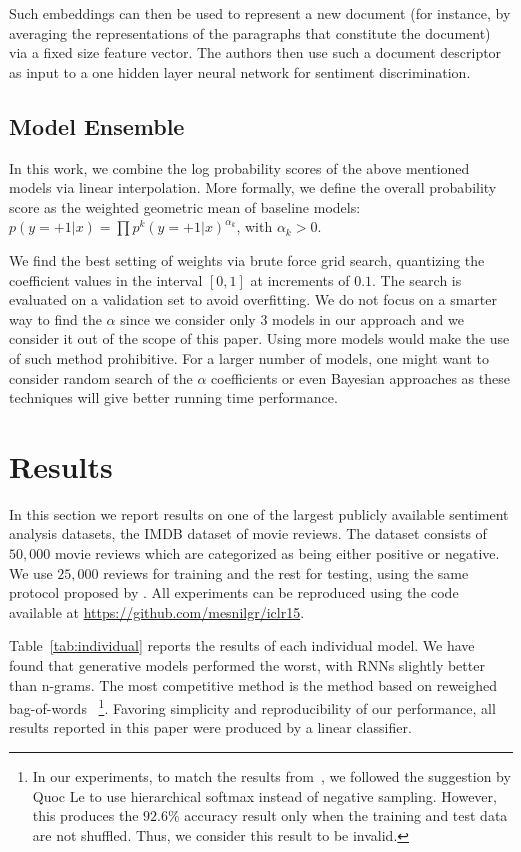 \documentclass{article} %
\begin{document}
Such embeddings can then be used to represent a new document (for instance, by
averaging the representations of the paragraphs that constitute the document)
via a fixed size feature vector.  The authors then use such a document
descriptor as input to a one hidden layer neural network for sentiment
discrimination.

\subsection{ Model Ensemble \label{sec:ensemble}}

In this work, we combine the log probability scores of the above mentioned
models via linear interpolation. More formally, we define the overall
probability score as the weighted geometric mean of baseline models: $p(y=+1 |
x) = \prod p^{k}(y=+1 | x)^{\alpha_k}$, with $\alpha_k > 0$.

We find the best setting of weights via brute force grid search, quantizing the
coefficient values in the interval $[ 0, 1 ]$ at increments of $0.1$. The search is
evaluated on a validation set to avoid overfitting. We do not focus on a
smarter way to find the $\alpha$ since we consider only $3$ models in our approach
and we consider it out of the scope of this paper. Using more models would make
the use of such method prohibitive. For a larger number of models, one might
want to consider random search of the $\alpha$ coefficients or even Bayesian
approaches as these techniques will give better running time performance. 

\section{Results}

In this section we report results on one of the largest publicly available
sentiment analysis datasets, the IMDB dataset of movie reviews. The dataset
consists of $50,000$ movie reviews which are categorized as being either positive
or negative. We use $25,000$ reviews for training and the rest for testing, using
the same protocol proposed by \citep{Maas2011}.  All experiments can
be reproduced using the code available at \url{https://github.com/mesnilgr/iclr15}.


Table~\ref{tab:individual} reports the results of each individual model. We
have found that generative models performed the worst, with RNNs slightly
better than n-grams.  The most competitive method is the method based on
reweighed bag-of-words~\citep{Wang2012} \footnote{In our experiments, to match
the results from~\citep{Le2014}, we followed the suggestion by Quoc Le to use
hierarchical softmax instead of negative sampling.  However, this produces the
$92.6\%$ accuracy result only when the training and test data are not shuffled.
Thus, we consider this result to be invalid.}. Favoring simplicity and
reproducibility of our performance, all results reported in this paper were
produced by a linear classifier. 
\end{document}

